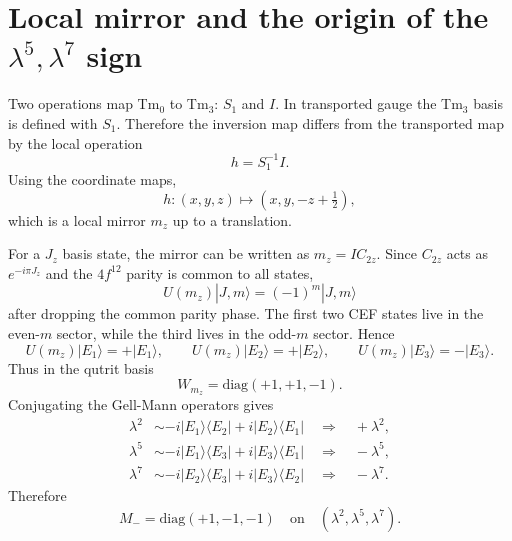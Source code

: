 \documentclass[11pt,a4paper]{article}
\newcommand{\diag}{\mathrm{diag}}
\newcommand{\ket}[1]{|#1\rangle}
\newcommand{\bra}[1]{\langle #1|}
\begin{document}
\section{Local mirror and the origin of the $\lambda^5,\lambda^7$ sign}

Two operations map Tm$_0$ to Tm$_3$: $S_1$ and $I$.  In transported gauge the Tm$_3$ basis is defined with $S_1$.  Therefore the inversion map differs from the transported map by the local operation
\begin{equation}
  h=S_1^{-1}I.
\end{equation}
Using the coordinate maps,
\begin{equation}
  h:(x,y,z)\mapsto(x,y,-z+\tfrac12),
\end{equation}
which is a local mirror $m_z$ up to a translation.

For a $J_z$ basis state, the mirror can be written as $m_z=IC_{2z}$.  Since $C_{2z}$ acts as $e^{-i\pi J_z}$ and the $4f^{12}$ parity is common to all states,
\begin{equation}
  U(m_z)\ket{J,m}=(-1)^m\ket{J,m}
\end{equation}
after dropping the common parity phase.
The first two CEF states live in the even-$m$ sector, while the third lives in the odd-$m$ sector.  Hence
\begin{equation}
  U(m_z)\ket{E_1}=+\ket{E_1},\qquad
  U(m_z)\ket{E_2}=+\ket{E_2},\qquad
  U(m_z)\ket{E_3}=-\ket{E_3}.
\end{equation}
Thus in the qutrit basis
\begin{equation}
  W_{m_z}=\diag(+1,+1,-1).
\end{equation}
Conjugating the Gell-Mann operators gives
\begin{align}
  \lambda^2&\sim -i\ket{E_1}\bra{E_2}+i\ket{E_2}\bra{E_1}
  \quad\Rightarrow\quad +\lambda^2,\\
  \lambda^5&\sim -i\ket{E_1}\bra{E_3}+i\ket{E_3}\bra{E_1}
  \quad\Rightarrow\quad -\lambda^5,\\
  \lambda^7&\sim -i\ket{E_2}\bra{E_3}+i\ket{E_3}\bra{E_2}
  \quad\Rightarrow\quad -\lambda^7.
\end{align}
Therefore
\begin{equation}
  \boxed{
  M_- = \diag(+1,-1,-1)
  \quad\text{on}\quad
  (\lambda^2,\lambda^5,\lambda^7).}
\end{equation}
\end{document}
